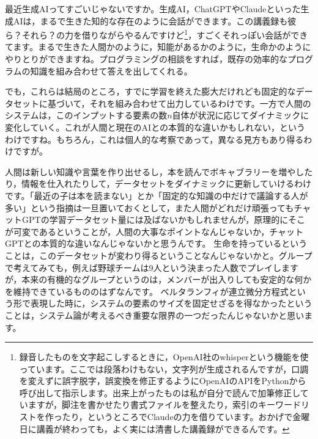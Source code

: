 \documentclass{ltjsbook}
\begin{document}
最近生成AIってすごいじゃないですか。生成AI，ChatGPTやClaudeといった生成AIは，まるで生きた知的な存在のように会話ができます。この講義録も彼ら？それら？の力を借りながらやるんですけど\footnote{録音したものを文字起こしするときに，OpenAI社のwhisperという機能を使っています。ここでは段落わけもない，文字列が生成されるんですが，口調を変えずに誤字脱字，誤変換を修正するようにOpenAIのAPIをPythonから呼び出して指示します。出来上がったものは私が自分で読んで加筆修正していますが，脚注を書かせたり書式ファイルを整えたり，索引のキーワードリストを作ったり，というところでClaudeの力を借りています。おかげで金曜日に講義が終わっても，よく実には清書した講義録ができるんです。}，すごくそれっぽい会話ができてます。まるで生きた人間かのように，知能があるかのように，生命かのようにやりとりができますね。プログラミングの相談をすれば，既存の効率的なプログラムの知識を組み合わせて答えを出してくれる。

でも，これらは結局のところ，すでに学習を終えた膨大だけれども固定的なデータセットに基づいて，それを組み合わせて出力しているわけです。一方で人間のシステムは，このインプットする要素の数$n$自体が状況に応じてダイナミックに変化していく。これが人間と現在のAIとの本質的な違いかもしれない，というわけですね。もちろん，これは個人的な考察であって，異なる見方もあり得るわけですが。

人間は新しい知識や言葉を作り出せるし，本を読んでボキャブラリーを増やしたり，情報を仕入れたりして，データセットをダイナミックに更新していけるわけです。「最近の子は本を読まない」とか「固定的な知識の中だけで議論する人が多い」という指摘は一旦置いておくとして，また人間がどれだけ頑張ってもチャットGPTの学習データセット量には及ばないかもしれませんが，原理的にそこが可変であるということが，人間の大事なポイントなんじゃないか，チャットGPTとの本質的な違いなんじゃないかと思うんです。
生命を持っているということは，このデータセットが変わり得るということなんじゃないかと。グループで考えてみても，例えば野球チームは9人という決まった人数でプレイしますが，本来の有機的なグループというのは，メンバーが出入りしても安定的な何かを維持できているもののはずなんです。
ベルタランフィが連立微分方程式という形で表現した時に，システムの要素のサイズを固定せざるを得なかったということは，システム論が考えるべき重要な限界の一つだったんじゃないかと思います。
\end{document}
